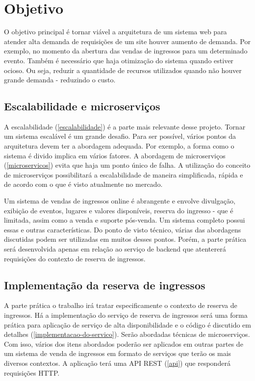 \chapter{Objetivo}

O objetivo principal é tornar viável a arquitetura de um sistema web para atender
alta demanda de requisições de um site houver aumento de demanda.
Por exemplo, no momento da abertura das vendas de ingressos para um determinado evento.
Também é necessário que haja otimização do sistema quando estiver ocioso.
Ou seja, reduzir a quantidade de recursos utilizados quando não houver
grande demanda - reduzindo o custo.

\section{Escalabilidade e microserviços}
A escalabilidade (\autoref{escalabilidade}) é a parte mais relevante desse projeto.
Tornar um sistema escalável é um grande desafio.
Para ser possível, vários pontos da arquitetura devem ter a
abordagem adequada. Por exemplo, a forma como o sistema é divido implica em vários
fatores.
A abordagem de microserviços (\autoref{microservicos}) evita que haja um ponto único de falha. A
utilização do conceito de microserviços possibilitará a escalabilidade de maneira
simplificada, rápida e de acordo com o que é visto atualmente no mercado.

Um sistema de vendas de ingressos online é abrangente e envolve divulgação,
exibição de eventos, lugares e valores disponíveis, reserva do ingresso -
que é limitada, assim como a venda e suporte pós-venda. Um sistema completo possui essas
e outras características. Do ponto de visto técnico, várias das abordagens discutidas
podem ser utilizadas em muitos desses pontos. Porém, a parte prática será desenvolvida
apenas em relação ao serviço de backend que atentererá requisições do contexto de reserva
de ingressos.

\section{Implementação da reserva de ingressos}

A parte prática o trabalho irá tratar especificamente o contexto de reserva de ingressos.
Há a implementação do serviço de reserva de ingressos será uma forma prática para aplicação
de serviço de alta disponibilidade e o código é discutido em detalhes
(\autoref{implementacao-do-servico}). Serão abordadas técnicas de microserviços.
Com isso, vários dos itens abordados poderão ser aplicados em outras partes de um sistema
de venda de ingressos em formato de serviços que terão os mais diversos contextos.
A aplicação terá uma API REST (\autoref{api}) que responderá requisições HTTP.

